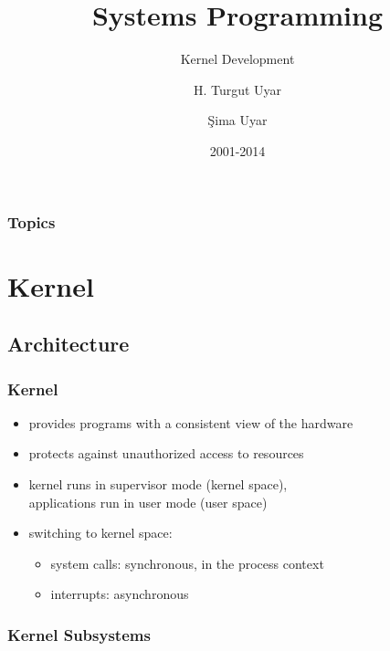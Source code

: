 \documentclass[dvipsnames]{beamer}
\title{Systems Programming}
\subtitle{Kernel Development}
\author{H. Turgut Uyar \and Şima Uyar}
\date{2001-2014}
\begin{document}
\begin{frame}
  \titlepage
\end{frame}

\begin{frame}
  \frametitle{Topics}
  \tableofcontents
\end{frame}

\section{Kernel}

\subsection{Architecture}

\begin{frame}
  \frametitle{Kernel}

  \begin{itemize}
    \item provides programs with a consistent view of the hardware

    \bigskip
    \item protects against unauthorized access to resources
    \item kernel runs in supervisor mode (kernel space),\\
      applications run in user mode (user space)

    \pause
    \medskip
    \item switching to kernel space:
    \begin{itemize}
      \item system calls: synchronous, in the process context
      \item interrupts: asynchronous
    \end{itemize}
  \end{itemize}
\end{frame}

\begin{frame}
  \frametitle{Kernel Subsystems}

  \begin{center}
  \end{center}
\end{frame}
\end{document}
